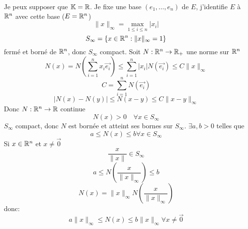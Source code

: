 \begin{preuve}
    Je peux supposer que $\mathbb{K} = \mathbb{R}$. Je fixe  une base $(e_1, \ldots, e_n)$ de $E$, j'identifie  $E$ à  $\mathbb{R}^n$ avec cette base ($E = \mathbb{R}^n$)
    \[
    \|x\|_{\infty} = \max_{1 \le i \le n} |x_i|
    \] 
    \[
    S_{\infty} = \{ x \in \mathbb{R}^n: \|x\|_{\infty} = 1 \}
    \] 
    fermé et borné de $\mathbb{R}^n$, donc $S_{\infty}$ compact. Soit $N: \mathbb{R}^n \to \mathbb{R}_{+}$ une norme sur $\mathbb{R}^n$
    \[
        N(x) = N(\sum_{i=1}^{n} x_i\vec{e_i}) \le  \sum_{i=1}^{n} |x_i|N(\vec{e_i}) \le C\|x\|_{\infty}
    \] 
    \[
        C = \sum_{i=1}^{n} N(\vec{e_i})
    \] 
    \[
    \left| N(x) - N(y) \right| \le N(x - y) \le C \|x - y\|_{\infty}
    \] 
    Donc $N: \mathbb{R}^n \to  \mathbb{R}$ continue
    \[
    N(x) > 0 \quad \forall x \in S_{\infty}
    \] 
    $S_{\infty}$ compact, donc $N$ est bornée et atteint ses bornes sur  $S_{\infty}$. $\exists a, b > 0$ telles que 
    \[
    a \le N(x) \le b \forall x \in S_{\infty}
    \] 
    Si $x \in \mathbb{R}^n$ et $x \neq \vec{0}$
    \[
    \frac{x}{\|x\|} \in S_{\infty}
    \] 
    \[
    a \le N(\frac{x}{\|x\|_{\infty}}) \le b
    \] 
    \[
    N(x) = \|x\|_{\infty}N(\frac{x}{\|x\|_{\infty}})
    \] 
    donc: 
    \[
        a \|x\|_{\infty} \le  N(x) \le b\|x\|_{\infty} \forall x \neq  \vec{0}
    \] 
\end{preuve}
